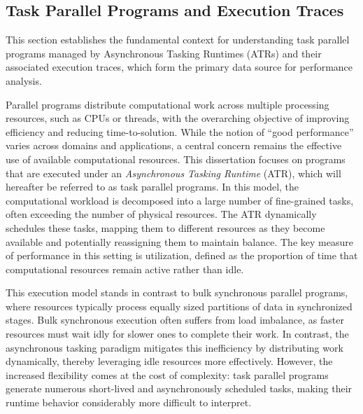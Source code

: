 \begin{refsection}

\section{Task Parallel Programs and Execution Traces}
\label{sec:tasktraces}

This section establishes the fundamental context for understanding task parallel programs managed by Asynchronous Tasking Runtimes (ATRs) and their associated execution traces, which form the primary data source for performance analysis.

Parallel programs distribute computational work across multiple processing resources, such as CPUs or threads, with the overarching objective of improving efficiency and reducing time-to-solution. While the notion of “good performance” varies across domains and applications, a central concern remains the effective use of available computational resources. This dissertation focuses on programs that are executed under an \emph{Asynchronous Tasking Runtime} (ATR), which will hereafter be referred to as task parallel programs. In this model, the computational workload is decomposed into a large number of fine-grained tasks, often exceeding the number of physical resources. The ATR dynamically schedules these tasks, mapping them to different resources as they become available and potentially reassigning them to maintain balance. The key measure of performance in this setting is utilization, defined as the proportion of time that computational resources remain active rather than idle.

This execution model stands in contrast to bulk synchronous parallel programs, where resources typically process equally sized partitions of data in synchronized stages. Bulk synchronous execution often suffers from load imbalance, as faster resources must wait idly for slower ones to complete their work. In contrast, the asynchronous tasking paradigm mitigates this inefficiency by distributing work dynamically, thereby leveraging idle resources more effectively. However, the increased flexibility comes at the cost of complexity: task parallel programs generate numerous short-lived and asynchronously scheduled tasks, making their runtime behavior considerably more difficult to interpret.


\end{refsection}
